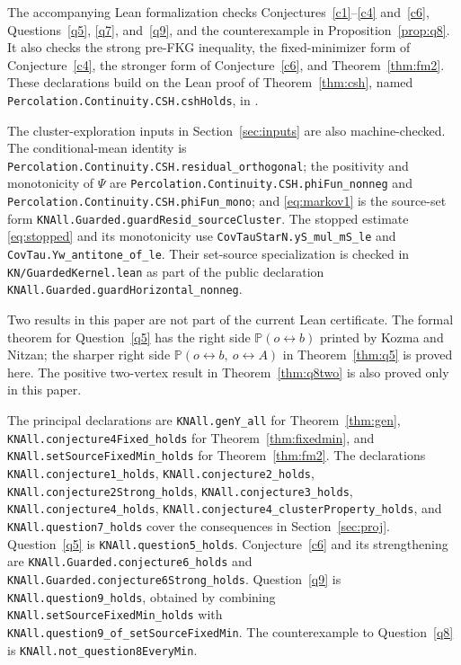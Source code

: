 \documentclass[11pt]{article}
\theoremstyle{definition}
\theoremstyle{remark}
\newcommand{\PP}{\mathbb P}
\newcommand{\con}{\leftrightarrow}
\begin{document}
The accompanying Lean formalization checks Conjectures~\ref{c1}--\ref{c4} and~\ref{c6},
Questions~\ref{q5}, \ref{q7}, and~\ref{q9}, and the counterexample in
Proposition~\ref{prop:q8}. It also checks the strong pre-FKG inequality, the fixed-minimizer
form of Conjecture~\ref{c4}, the stronger form of Conjecture~\ref{c6}, and
Theorem~\ref{thm:fm2}. These declarations build on the Lean proof of
Theorem~\ref{thm:csh}, named \texttt{Percolation.Continuity.CSH.cshHolds}, in \cite{Dev}.

The cluster-exploration inputs in Section~\ref{sec:inputs} are also machine-checked. The
conditional-mean identity is
\nolinkurl{Percolation.Continuity.CSH.residual_orthogonal}; the positivity and
monotonicity of $\Psi$ are \nolinkurl{Percolation.Continuity.CSH.phiFun_nonneg} and
\nolinkurl{Percolation.Continuity.CSH.phiFun_mono}; and \eqref{eq:markov1} is the
source-set form \nolinkurl{KNAll.Guarded.guardResid_sourceCluster}. The stopped estimate
\eqref{eq:stopped} and its monotonicity use
\nolinkurl{CovTauStarN.yS_mul_mS_le} and
\nolinkurl{CovTau.Yw_antitone_of_le}. Their set-source specialization is checked in
\nolinkurl{KN/GuardedKernel.lean} as part of the public declaration
\nolinkurl{KNAll.Guarded.guardHorizontal_nonneg}.

Two results in this paper are not part of the current Lean certificate. The formal
theorem for Question~\ref{q5} has the right side $\PP(o\con b)$ printed by Kozma and Nitzan;
the sharper right side $\PP(o\con b,\ o\con A)$ in Theorem~\ref{thm:q5} is proved here.
The positive two-vertex result in Theorem~\ref{thm:q8two} is also proved only in this
paper.

\begingroup
\raggedright
{}
\setlength{\parindent}{1.5em}
\setlength{\emergencystretch}{4em}
The principal declarations are \texttt{KNAll.genY\_all} for Theorem~\ref{thm:gen},
\texttt{KNAll.conjecture4Fixed\_holds} for Theorem~\ref{thm:fixedmin}, and
\texttt{KNAll.setSourceFixedMin\_holds} for Theorem~\ref{thm:fm2}. The declarations
\texttt{KNAll.conjecture1\_holds}, \texttt{KNAll.conjecture2\_holds},
\texttt{KNAll.conjecture2Strong\_holds}, \texttt{KNAll.conjecture3\_holds},
\texttt{KNAll.conjecture4\_holds},
\texttt{KNAll.conjecture4\_clusterProperty\_holds}, and
\texttt{KNAll.question7\_holds} cover the consequences in
Section~\ref{sec:proj}. Question~\ref{q5} is \texttt{KNAll.question5\_holds}.
Conjecture~\ref{c6} and its strengthening are \texttt{KNAll.Guarded.conjecture6\_holds}
and \texttt{KNAll.Guarded.conjecture6Strong\_holds}. Question~\ref{q9} is
\texttt{KNAll.question9\_holds}, obtained by combining
\texttt{KNAll.setSourceFixedMin\_holds} with
\texttt{KNAll.question9\_of\_setSourceFixedMin}. The counterexample to
Question~\ref{q8} is \texttt{KNAll.not\_question8EveryMin}.
\end{document}

